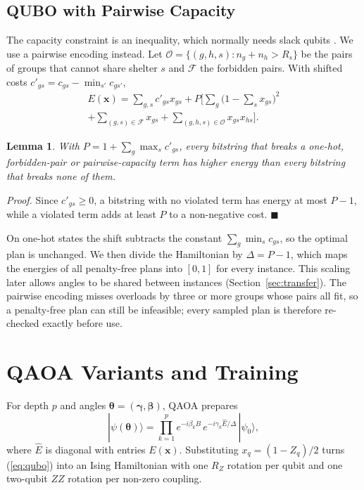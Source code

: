 \documentclass[conference]{IEEEtran}
\newtheorem{lemma}{Lemma}
\begin{document}
\subsection{QUBO with Pairwise Capacity}
The capacity constraint is an inequality, which normally needs slack qubits \cite{Glover2019}. We use a pairwise encoding instead. Let $\mathcal{O}=\{(g,h,s): n_g+n_h>R_s\}$ be the pairs of groups that cannot share shelter $s$ and $\mathcal{F}$ the forbidden pairs. With shifted costs $c'_{gs}=c_{gs}-\min_{s'}c_{gs'}$,
\begin{multline}
E(\mathbf{x})=\sum_{g,s}c'_{gs}x_{gs}+P\Big[\sum_g\Big(1-\sum_s x_{gs}\Big)^2\\
+\sum_{(g,s)\in\mathcal{F}}x_{gs}+\sum_{(g,h,s)\in\mathcal{O}}x_{gs}x_{hs}\Big].
\label{eq:qubo}
\end{multline}

\begin{lemma}
With $P=1+\sum_g\max_s c'_{gs}$, every bitstring that breaks a one-hot, forbidden-pair or pairwise-capacity term has higher energy than every bitstring that breaks none of them.
\end{lemma}
\noindent\textit{Proof.} Since $c'_{gs}\ge0$, a bitstring with no violated term has energy at most $P-1$, while a violated term adds at least $P$ to a non-negative cost. \hfill$\blacksquare$

\smallskip
On one-hot states the shift subtracts the constant $\sum_g\min_s c_{gs}$, so the optimal plan is unchanged. We then divide the Hamiltonian by $\Delta=P-1$, which maps the energies of all penalty-free plans into $[0,1]$ for every instance. This scaling later allows angles to be shared between instances (Section~\ref{sec:transfer}). The pairwise encoding misses overloads by three or more groups whose pairs all fit, so a penalty-free plan can still be infeasible; every sampled plan is therefore re-checked exactly before use.

\section{QAOA Variants and Training}
For depth $p$ and angles $\boldsymbol\theta=(\boldsymbol\gamma,\boldsymbol\beta)$, QAOA prepares
\begin{equation}
|\psi(\boldsymbol\theta)\rangle=\prod_{k=1}^{p}e^{-i\beta_k B}\,e^{-i\gamma_k \hat E/\Delta}\,|\psi_0\rangle,
\end{equation}
where $\hat E$ is diagonal with entries $E(\mathbf{x})$. Substituting $x_q=(1-Z_q)/2$ turns (\ref{eq:qubo}) into an Ising Hamiltonian with one $R_Z$ rotation per qubit and one two-qubit $ZZ$ rotation per non-zero coupling.
\end{document}
